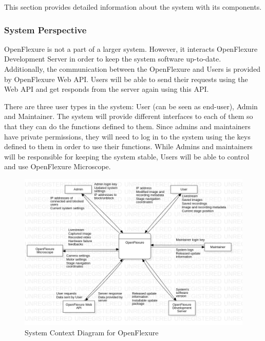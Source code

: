 This section provides detailed information about the system with its components.


\subsubsection{System Perspective}
OpenFlexure is not a part of a larger system. However, it interacts OpenFlexure Development Server in order to keep the system software up-to-date. Additionally, the communication between the OpenFlexure and Users is provided by OpenFlexure Web API. Users will be able to send their requests using the Web API and get responds from the server again using this API.

There are three user types in the system: User (can be seen as end-user), Admin and Maintainer. The system will provide different interfaces to each of them so that they can do the functions defined to them. Since admins and maintainers have private permissions, they will need to log in to the system using the keys defined to them in order to use their functions. While Admins and maintainers will be responsible for keeping the system stable, Users will be able to control and use OpenFlexure Microscope.

\begin{figure}[H]
	\centering
	\includegraphics[scale=0.5]{Uml_Images/system_context_diagram}
	\caption{System Context Diagram for OpenFlexure}
	\label{fig:system_context_diagram}
\end{figure}


